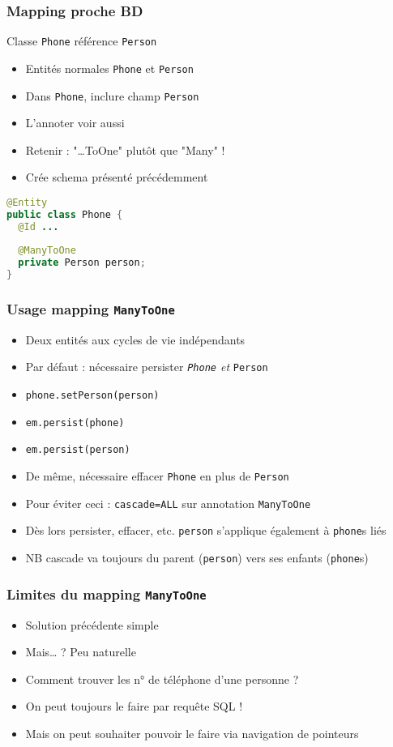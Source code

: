 \documentclass[english, french]{beamer}
\begin{document}
\begin{frame}[fragile]
	\frametitle{Mapping proche BD}
	Classe \texttt{Phone} référence \texttt{Person}
	\begin{itemize}
		\item Entités normales \texttt{Phone} et \texttt{Person}
		\item Dans \texttt{Phone}, inclure champ \texttt{Person}
		\item L’annoter  {\tiny voir aussi }
		\item Retenir : "…ToOne" plutôt que "Many" !
		 \item Crée schema présenté précédemment
	\end{itemize}
	\begin{lstlisting}[language=Java]
@Entity
public class Phone {
  @Id ...
  
  @ManyToOne
  private Person person;
}
	\end{lstlisting}
\end{frame}

\begin{frame}
	\frametitle{Usage mapping \texttt{ManyToOne}}
	\begin{itemize}
		\item Deux entités aux cycles de vie indépendants
		\item Par défaut : nécessaire persister \emph{\texttt{Phone} et} \texttt{Person}
		\item \texttt{phone.setPerson(person)}
		\item \texttt{em.persist(phone)}
		\item \texttt{em.persist(person)}
		\item De même, nécessaire effacer \texttt{Phone} en plus de \texttt{Person}
		\item Pour éviter ceci : \texttt{cascade=ALL} sur annotation \texttt{ManyToOne}
		\item Dès lors persister, effacer, etc. \texttt{person} s’applique également à \texttt{phone}s liés
		\item NB cascade va toujours du parent (\texttt{person}) vers ses enfants (\texttt{phone}s)
	\end{itemize}
\end{frame}

\begin{frame}
	\frametitle{Limites du mapping \texttt{ManyToOne}}
	\begin{itemize}
		\item Solution précédente simple
		\item Mais… ? \pause Peu naturelle \pause
		\item Comment trouver les n° de téléphone d’une personne ? \pause
		\item On peut toujours le faire par requête SQL !
		\item Mais on peut souhaiter pouvoir le faire via navigation de pointeurs
	\end{itemize}
\end{frame}
\end{document}
